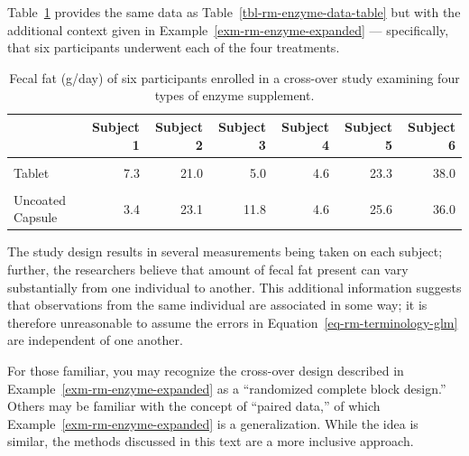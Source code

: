\documentclass[
  letterpaper,
  DIV=11,
  numbers=noendperiod]{scrreprt}
\theoremstyle{definition}
\theoremstyle{definition}
\theoremstyle{remark}
\begin{document}
Table~\ref{tbl-rm-enzyme-data-table-expanded} provides the same data as
Table~\ref{tbl-rm-enzyme-data-table} but with the additional context
given in Example~\ref{exm-rm-enzyme-expanded} --- specifically, that six
participants underwent each of the four treatments.

\hypertarget{tbl-rm-enzyme-data-table-expanded}{}
\begin{table}
\caption{\label{tbl-rm-enzyme-data-table-expanded}Fecal fat (g/day) of six participants enrolled in a cross-over study
examining four types of enzyme supplement. }\tabularnewline

\centering
\begin{tabular}[t]{lrrrrrr}
\toprule
  & Subject 1 & Subject 2 & Subject 3 & Subject 4 & Subject 5 & Subject 6\\
\midrule
\cellcolor{gray!10}{Placebo} & \cellcolor{gray!10}{44.5} & \cellcolor{gray!10}{33.0} & \cellcolor{gray!10}{19.1} & \cellcolor{gray!10}{9.4} & \cellcolor{gray!10}{71.3} & \cellcolor{gray!10}{51.2}\\
Tablet & 7.3 & 21.0 & 5.0 & 4.6 & 23.3 & 38.0\\
\cellcolor{gray!10}{Coated Capsule} & \cellcolor{gray!10}{12.4} & \cellcolor{gray!10}{25.6} & \cellcolor{gray!10}{22.0} & \cellcolor{gray!10}{5.8} & \cellcolor{gray!10}{68.2} & \cellcolor{gray!10}{52.6}\\
Uncoated Capsule & 3.4 & 23.1 & 11.8 & 4.6 & 25.6 & 36.0\\
\bottomrule
\end{tabular}
\end{table}

The study design results in several measurements being taken on each
subject; further, the researchers believe that amount of fecal fat
present can vary substantially from one individual to another. This
additional information suggests that observations from the same
individual are associated in some way; it is therefore unreasonable to
assume the errors in Equation~\ref{eq-rm-terminology-glm} are
independent of one another.

\begin{tcolorbox}[enhanced jigsaw, left=2mm, toprule=.15mm, arc=.35mm, breakable, opacitybacktitle=0.6, opacityback=0, rightrule=.15mm, colbacktitle=quarto-callout-note-color!10!white, coltitle=black, leftrule=.75mm, toptitle=1mm, colframe=quarto-callout-note-color-frame, titlerule=0mm, title=\textcolor{quarto-callout-note-color}{\faInfo}\hspace{0.5em}{Note}, bottomrule=.15mm, colback=white, bottomtitle=1mm]

For those familiar, you may recognize the cross-over design described in
Example~\ref{exm-rm-enzyme-expanded} as a ``randomized complete block
design.'' Others may be familiar with the concept of ``paired data,'' of
which Example~\ref{exm-rm-enzyme-expanded} is a generalization. While
the idea is similar, the methods discussed in this text are a more
inclusive approach.

\end{tcolorbox}
\end{document}
